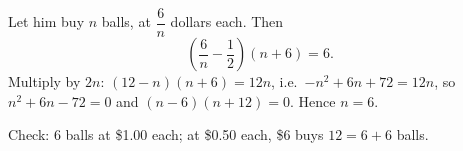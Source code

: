 Let him buy $n$ balls, at $\dfrac{6}{n}$ dollars each. Then
\[
\left(\dfrac{6}{n}-\dfrac{1}{2}\right)(n+6)=6 .
\]
Multiply by $2n$: $(12-n)(n+6)=12n$, i.e.\ $-n^2+6n+72=12n$, so $n^2+6n-72=0$ and $(n-6)(n+12)=0$. Hence $n=\boxed{6}$.

Check: $6$ balls at \$1.00 each; at \$0.50 each, \$6 buys $12=6+6$ balls.
